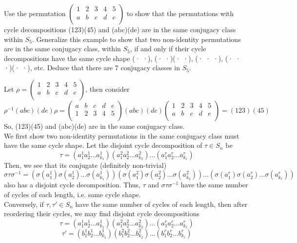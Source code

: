 \documentclass[a4paper]{article}
\begin{document}
\begin{qns}
Use the permutation $\begin{pmatrix}1&2&3&4&5\\a&b&c&d&e\\\end{pmatrix}$ to show that the permutations with cycle decompositions (123)(45) and (abc)(de) are in the same conjugacy class within $S_5$. Generalize this example to show that two non-identity permutations are in the same conjugacy class, within $S_5$, if and only if their cycle decompositions have the same cycle shape (· ·), (· ·)(· ·), (· · ·), (· · ·)(· ·), etc. Deduce that there are 7 conjugacy classes in $S_5$.
\end{qns}
\begin{ans}
Let $\rho=\begin{pmatrix}1&2&3&4&5\\a&b&c&d&e\\\end{pmatrix}$, then consider
$$\rho^{-1}(abc)(de)\rho=\begin{pmatrix}a&b&c&d&e\\1&2&3&4&5\\\end{pmatrix}(abc)(de)\begin{pmatrix}1&2&3&4&5\\a&b&c&d&e\\\end{pmatrix}=(123)(45)$$
So, (123)(45) and (abc)(de) are in the same conjugacy class.\\[5pt]
We first show two non-identity permutations in the same conjugacy class must have the same cycle shape. Let the disjoint cycle decomposition of $\tau\in S_n$ be
$$\tau=(a_1^1a_2^1\dots a_{k_1}^1)(a_1^2a_2^2\dots a_{k_2}^2)\dots (a_1^ra_2^r\dots a_{k_r}^r)$$
Then, we see that its conjugate (definitely non-trivial)
$$\sigma\tau\sigma^{-1}=(\sigma(a_1^1)\sigma(a_2^1)\dots\sigma(a_{k_1}^1))(\sigma(a_1^2)\sigma(a_2^2)\dots\sigma(a_{k_2}^2))\dots(\sigma(a_1^r)\sigma(a_2^r)\dots\sigma(a_{k_r}^r))$$
also has a disjoint cycle decomposition. Thus, $\tau$ and $\sigma\tau\sigma^{-1}$ have the same number of cycles of each length, i.e. same cycle shape.\\[5pt]
Conversely, if $\tau,\tau'\in S_n$ have the same number of cycles of each length, then after reordering their cycles, we may find disjoint cycle decompositions
$$\tau=(a_1^1a_2^1\dots a_{k_1}^1)(a_1^2a_2^2\dots a_{k_2}^2)\dots(a_1^ra_2^r\dots a_{k_r}^r)$$
$$\tau'=(b_1^1b_2^1\dots b_{k_1}^1)(b_1^2b_2^2\dots b_{k_2}^2)\dots(b_1^rb_2^r\dots b_{k_r}^r)$$

\end{ans}
\end{document}
